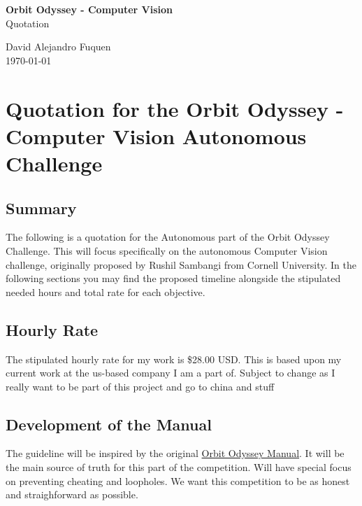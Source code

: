 \documentclass[a4]{article}
\begin{document}
\thispagestyle{fancy}

\begin{center}
    \textbf{\large Orbit Odyssey - Computer Vision} \\
    {Quotation}
    
    \vspace{0.7em}

    David Alejandro Fuquen \\

    {\small \today}

\end{center}

\section*{Quotation for the Orbit Odyssey - Computer Vision Autonomous Challenge}

\subsection*{Summary}
The following is a quotation for the Autonomous part of the Orbit Odyssey Challenge. This will focus specifically on the autonomous Computer Vision challenge, originally proposed by Rushil Sambangi from Cornell University. In the following sections you may find the proposed timeline alongside the stipulated needed hours and total rate for each objective.

\subsection*{Hourly Rate}
The stipulated hourly rate for my work is \$28.00 USD. This is based upon my current work at the us-based company I am a part of. Subject to change as I really want to be part of this project and go to china and stuff

\subsection*{Development of the Manual}

The guideline will be inspired by the original \href{https://docs.google.com/document/d/1N_mCX1EM3w5nDMbHrX3vcQlSqa2yJL38nCU0xxMPxmY/edit?tab=t.0}{Orbit Odyssey Manual}. It will be the main source of truth for this part of the competition. Will have special focus on preventing cheating and loopholes. We want this competition to be as honest and straighforward as possible.
\end{document}
